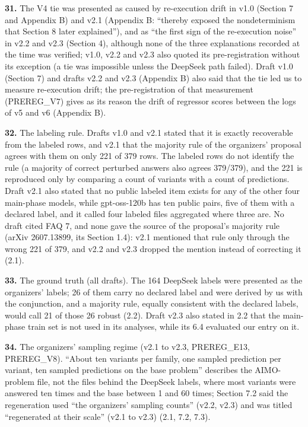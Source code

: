 \noindent\textbf{31.} The V4 tie was presented as caused by re-execution drift in v1.0 (Section 7 and Appendix B) and v2.1 (Appendix B: ``thereby exposed the nondeterminism that Section 8 later explained''), and as ``the first sign of the re-execution noise'' in v2.2 and v2.3 (Section 4), although none of the three explanations recorded at the time was verified; v1.0, v2.2 and v2.3 also quoted its pre-registration without its exception (a tie was impossible unless the DeepSeek path failed). Draft v1.0 (Section 7) and drafts v2.2 and v2.3 (Appendix B) also said that the tie led us to measure re-execution drift; the pre-registration of that measurement (PREREG\_V7) gives as its reason the drift of regressor scores between the logs of v5 and v6 (Appendix B).
\par

\noindent\textbf{32.} The labeling rule. Drafts v1.0 and v2.1 stated that it is exactly recoverable from the labeled rows, and v2.1 that the majority rule of the organizers' proposal agrees with them on only 221 of 379 rows. The labeled rows do not identify the rule (a majority of correct perturbed answers also agrees 379/379), and the 221 is reproduced only by comparing a count of variants with a count of predictions. Draft v2.1 also stated that no public labeled item exists for any of the other four main-phase models, while gpt-oss-120b has ten public pairs, five of them with a declared label, and it called four labeled files aggregated where three are. No draft cited FAQ 7, and none gave the source of the proposal's majority rule (arXiv 2607.13899, its Section 1.4): v2.1 mentioned that rule only through the wrong 221 of 379, and v2.2 and v2.3 dropped the mention instead of correcting it (2.1).
\par

\noindent\textbf{33.} The ground truth (all drafts). The 164 DeepSeek labels were presented as the organizers' labels; 26 of them carry no declared label and were derived by us with the conjunction, and a majority rule, equally consistent with the declared labels, would call 21 of those 26 robust (2.2). Draft v2.3 also stated in 2.2 that the main-phase train set is not used in its analyses, while its 6.4 evaluated our entry on it.
\par

\noindent\textbf{34.} The organizers' sampling regime (v2.1 to v2.3, PREREG\_E13, PREREG\_V8). ``About ten variants per family, one sampled prediction per variant, ten sampled predictions on the base problem'' describes the AIMO-problem file, not the files behind the DeepSeek labels, where most variants were answered ten times and the base between 1 and 60 times; Section 7.2 said the regeneration used ``the organizers' sampling counts'' (v2.2, v2.3) and was titled ``regenerated at their scale'' (v2.1 to v2.3) (2.1, 7.2, 7.3).
\par

